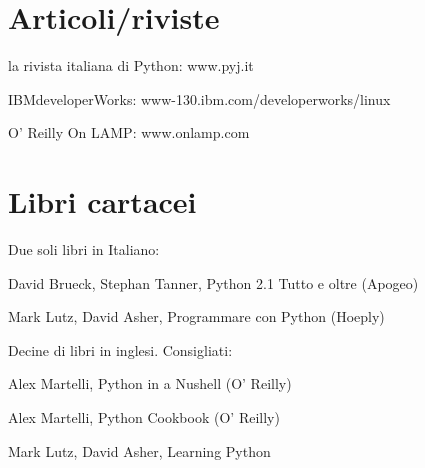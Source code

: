 \documentclass[10pt,a4paper,english]{article}
\begin{document}
\section*{Articoli/riviste}
\begin{list}{.}
{
\setlength{\rightmargin}{\leftmargin}
}
\item {} 
la rivista italiana di Python: www.pyj.it

\item {} 
IBMdeveloperWorks: www-130.ibm.com/developerworks/linux

\item {} 
O' Reilly On LAMP: www.onlamp.com

\end{list}



\hypertarget{libri-cartacei}{}
\section*{Libri cartacei}

Due soli libri in Italiano:
\begin{list}{.}
{
\setlength{\rightmargin}{\leftmargin}
}
\item {} 
David Brueck, Stephan Tanner, Python 2.1 Tutto e oltre  (Apogeo)

\item {} 
Mark Lutz, David Asher, Programmare con Python (Hoeply)

\end{list}

Decine di libri in inglesi. Consigliati:
\begin{list}{.}
{
\setlength{\rightmargin}{\leftmargin}
}
\item {} 
Alex Martelli, Python in a Nushell (O' Reilly)

\item {} 
Alex Martelli, Python Cookbook (O' Reilly)

\item {} 
Mark Lutz, David Asher, Learning Python

\end{list}
\end{document}
